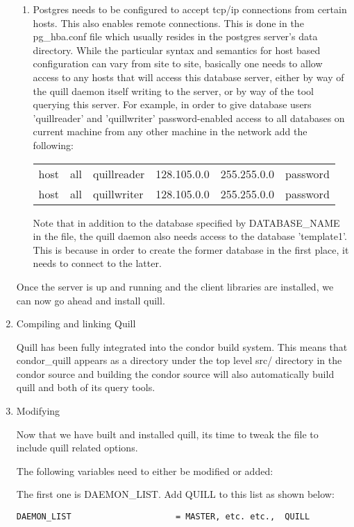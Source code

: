 \begin{enumerate}
\begin{enumerate}
\item Postgres needs to be configured to accept tcp/ip connections from
certain hosts.  This also enables remote connections.  This is done in
the pg\_hba.conf file which usually resides in the postgres server's
data directory.  While the particular syntax and semantics for host
based configuration can vary from site to site, basically one needs
to allow access to any hosts that will access this database server,
either by way of the quill daemon itself writing to the server, or by
way of the  tool querying this server.  For example, in order
to give database users 'quillreader' and 'quillwriter' password-enabled
access to all databases on current machine from any other machine in
the network add the following:

\begin{tabular}{llllll}
host&all&quillreader&128.105.0.0&255.255.0.0&password\\
host&all&quillwriter&128.105.0.0&255.255.0.0&password
\end{tabular}

Note that in addition to the database specified by DATABASE\_NAME in the
 file, the quill daemon also needs access to the database
'template1'.  This is because in order to create the former database in
the first place, it needs to connect to the latter.

\end{enumerate}

Once the server is up and running and the client libraries are installed, 
we can now go ahead and install quill.  

\item Compiling and linking Quill

Quill has been fully integrated into the condor build system.  This means
that condor\_quill appears as a directory under the top level src/
directory in the condor source and building the condor source will also
automatically build quill and both of its query tools.

\item Modifying 

Now that we have built and installed quill, its time to tweak the 
 file to include quill related options.

The following variables need to either be modified or added:

The first one is DAEMON\_LIST.  Add QUILL to this list as shown below:
\begin{verbatim}
DAEMON_LIST                     = MASTER, etc. etc.,  QUILL
\end{verbatim}


\end{enumerate}

